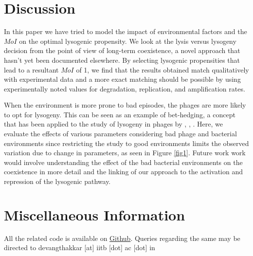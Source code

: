 \documentclass[12pt,letterpaper]{article}
\begin{document}
\section*{Discussion}

In this paper we have tried to model the impact of environmental factors and the $MoI$ on the optimal lysogenic propensity. We look at the lysis versus lysogeny decision from the point of view of long-term coexistence, a novel approach that hasn't yet been documented elsewhere. By selecting lysogenic propensities that lead to a resultant $MoI$ of 1, we find that the results obtained match qualitatively with experimental data and a more exact matching should be possible by using experimentally noted values for degradation, replication, and amplification rates. 

When the environment is more prone to bad episodes, the phages are more likely to opt for lysogeny. This can be seen as an example of bet-hedging, a concept that has been applied to the study of lysogeny in phages by \cite{avlund2009phage}, \cite{veening2008bistability}, \cite{mittler1996evolution}. Here, we evaluate the effects of various parameters considering bad phage and bacterial environments since restricting the study to good environments limits the observed variation due to change in parameters, as seen in Figure \ref{fig1}. Future work work would involve understanding the effect of the bad bacterial environments on the coexistence in more detail and the linking of our approach to the activation and repression of the lysogenic pathway.



\section*{Miscellaneous Information}
All the related code is available on \href{https://github.com/DevangThakkar/optimal_phage/tree/master/Run4}{Github}. Queries regarding the same may be directed to devangthakkar [at] iitb [dot] ac [dot] in

\nolinenumbers




\end{document}
